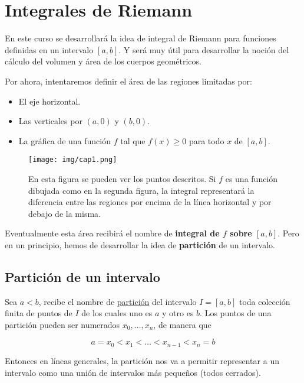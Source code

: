 
\section{Integrales de Riemann}

En este curso se desarrollará la idea de integral de Riemann para funciones definidas en un intervalo $[a,b]$. Y será muy útil para desarrollar la noción del cálculo del volumen y área de los cuerpos geométricos.

Por ahora, intentaremos definir el área de las regiones limitadas por:

\begin{itemize}
    \item El eje horizontal.
    \item Las verticales por $(a,0)$ y $(b,0)$.
    \item La gráfica de una función $f$ tal que $f(x) \geq 0$ para todo $x$ de $[a,b]$.
\end{itemize}

\begin{figure}[h]
    \centering
    \texttt{[image: img/cap1.png]}
    \caption{\footnotesize En esta figura se pueden ver los puntos descritos. Si $f$ es una función dibujada como en la segunda figura, la integral representará la diferencia entre las regiones por encima de la línea horizontal y por debajo de la misma.}
\end{figure}

Eventualmente esta área recibirá el nombre de \textbf{integral de $f$ sobre $[a,b]$}. Pero en un principio, hemos de desarrollar la idea de \textbf{partición} de un intervalo.

\subsection{Partición de un intervalo}

\begin{defn}
Sea $a<b$, recibe el nombre de \ul{partición} del intervalo $I = [a,b]$ toda colección finita de puntos de $I$ de los cuales uno es $a$ y otro es $b$. Los puntos de una partición pueden ser numerados $x_0, \dots, x_n$, de manera que

\[
a = x_0 < x_1 < \dots < x_{n-1} < x_n = b
\]
\end{defn}

Entonces en líneas generales, la partición nos va a permitir representar a un intervalo como una unión de intervalos más pequeños (todos cerrados).

